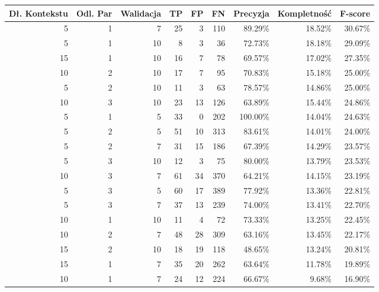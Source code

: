 \documentclass[a4paper,10pt]{report}
\begin{document}
\begin{table}[htp]
  \centering
    \begin{tabular}{rrrrrrrrr}
    \toprule
    \multicolumn{1}{c}{Dł. Kontekstu} & \multicolumn{1}{c}{Odl. Par} & \multicolumn{1}{c}{Walidacja} & TP    & FP    & FN    & \multicolumn{1}{c}{Precyzja} & \multicolumn{1}{c}{Kompletność} & \multicolumn{1}{c}{F-score} \\
    \midrule
    5     & 1     & 7     & 25    & 3     & 110   & 89.29\% & 18.52\% & 30.67\% \\
    5     & 1     & 10    & 8     & 3     & 36    & 72.73\% & 18.18\% & 29.09\% \\
    15    & 1     & 10    & 16    & 7     & 78    & 69.57\% & 17.02\% & 27.35\% \\
    10    & 2     & 10    & 17    & 7     & 95    & 70.83\% & 15.18\% & 25.00\% \\
    5     & 2     & 10    & 11    & 3     & 63    & 78.57\% & 14.86\% & 25.00\% \\
    10    & 3     & 10    & 23    & 13    & 126   & 63.89\% & 15.44\% & 24.86\% \\
    5     & 1     & 5     & 33    & 0     & 202   & 100.00\% & 14.04\% & 24.63\% \\
    5     & 2     & 5     & 51    & 10    & 313   & 83.61\% & 14.01\% & 24.00\% \\
    5     & 2     & 7     & 31    & 15    & 186   & 67.39\% & 14.29\% & 23.57\% \\
    5     & 3     & 10    & 12    & 3     & 75    & 80.00\% & 13.79\% & 23.53\% \\
    10    & 3     & 7     & 61    & 34    & 370   & 64.21\% & 14.15\% & 23.19\% \\
    5     & 3     & 5     & 60    & 17    & 389   & 77.92\% & 13.36\% & 22.81\% \\
    5     & 3     & 7     & 37    & 13    & 239   & 74.00\% & 13.41\% & 22.70\% \\
    10    & 1     & 10    & 11    & 4     & 72    & 73.33\% & 13.25\% & 22.45\% \\
    10    & 2     & 7     & 48    & 28    & 309   & 63.16\% & 13.45\% & 22.17\% \\
    15    & 2     & 10    & 18    & 19    & 118   & 48.65\% & 13.24\% & 20.81\% \\
    15    & 1     & 7     & 35    & 20    & 262   & 63.64\% & 11.78\% & 19.89\% \\
    10    & 1     & 7     & 24    & 12    & 224   & 66.67\% & 9.68\% & 16.90\% \\

\end{tabular}
\end{table}
\end{document}
